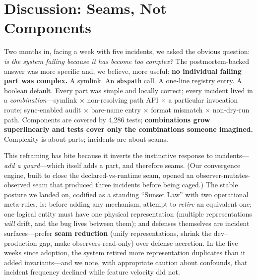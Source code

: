 \section{Discussion: Seams, Not Components}\label{sec:discussion}

Two months in, facing a week with five incidents, we asked the obvious
question: \emph{is the system failing because it has become too complex?}
The postmortem-backed answer was more specific and, we believe, more
useful: \textbf{no individual failing part was complex.} A symlink. An
\texttt{abspath} call. A one-line registry entry. A boolean default.
Every part was simple and locally correct; every incident lived in a
\emph{combination}---symlink $\times$ non-resolving path API $\times$ a
particular invocation route; sync-enabled audit $\times$ bare-name entry
$\times$ format mismatch $\times$ non-dry-run path. Components are
covered by 4{,}286 tests; \textbf{combinations grow superlinearly and
tests cover only the combinations someone imagined.} Complexity is about
parts; incidents are about seams.

This reframing has bite because it inverts the instinctive response to
incidents---\emph{add a guard}---which itself adds a part, and therefore
seams. (Our convergence engine, built to close the declared-vs-runtime
seam, opened an observer-mutates-observed seam that produced three
incidents before being caged.) The stable posture we landed on, codified
as a standing ``Sunset Law'' with two operational meta-rules, is: before
adding any mechanism, attempt to \emph{retire} an equivalent one; one
logical entity must have one physical representation (multiple
representations \emph{will} drift, and the bug lives between them); and
defenses themselves are incident surfaces---prefer \textbf{seam
reduction} (unify representations, shrink the dev--production gap, make
observers read-only) over defense accretion. In the five weeks since
adoption, the system retired more representation duplicates than it added
invariants---and we note, with appropriate caution about confounds, that
incident frequency declined while feature velocity did not.

